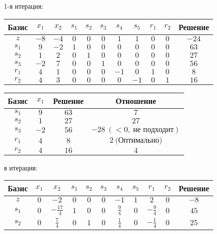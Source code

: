 \documentclass{article}%
\begin{document}
\begin{flushleft}%
1{-}я итерация: %
\newline%
\newline%
\renewcommand{\arraystretch}{1.3}%
\begin{tabular}{|c|ccccccccc|c|}%
\hline%
Базис&$x_{1}$&$x_{2}$&$s_{1}$&$s_{2}$&$s_{3}$&$s_{4}$&$s_{5}$&$r_{1}$&$r_{2}$&Решение\\%
\hline%
$z$&$-8$&$-4$&$0$&$0$&$0$&$1$&$1$&$0$&$0$&$-24$\\%
\hline%
$s_{1}$&$9$&$-2$&$1$&$0$&$0$&$0$&$0$&$0$&$0$&$63$\\%
$s_{2}$&$1$&$2$&$0$&$1$&$0$&$0$&$0$&$0$&$0$&$27$\\%
$s_{3}$&$-2$&$7$&$0$&$0$&$1$&$0$&$0$&$0$&$0$&$56$\\%
$r_{1}$&$4$&$1$&$0$&$0$&$0$&$-1$&$0$&$1$&$0$&$8$\\%
$r_{2}$&$4$&$3$&$0$&$0$&$0$&$0$&$-1$&$0$&$1$&$16$\\%
\hline%
\end{tabular}%
\newline%
\newline%
\newline%
\begin{tabular}{|cccc|}%
\hline%
Базис&$x_{1}$&Решение&Отношение\\%
\hline%
$s_{1}$&$9$&$63$&$7$\\%
$s_{2}$&$1$&$27$&$27$\\%
$s_{3}$&$-2$&$56$&$-28\: (< 0, \: \text{не подходит})$\\%
$r_{1}$&$4$&$8$&$2\: \text{(Оптимально)}$\\%
$r_{2}$&$4$&$16$&$4$\\%
\hline%
\end{tabular}%
\newline%
\newline%
я итерация: %
\newline%
\newline%
\renewcommand{\arraystretch}{1.3}%
\begin{tabular}{|c|ccccccccc|c|}%
\hline%
Базис&$x_{1}$&$x_{2}$&$s_{1}$&$s_{2}$&$s_{3}$&$s_{4}$&$s_{5}$&$r_{1}$&$r_{2}$&Решение\\%
\hline%
$z$&$0$&$-2$&$0$&$0$&$0$&$-1$&$1$&$2$&$0$&$-8$\\%
\hline%
$s_{1}$&$0$&$-\frac{17}{4}$&$1$&$0$&$0$&$\frac{9}{4}$&$0$&$-\frac{9}{4}$&$0$&$45$\\%
$s_{2}$&$0$&$\frac{7}{4}$&$0$&$1$&$0$&$\frac{1}{4}$&$0$&$-\frac{1}{4}$&$0$&$25$\\%

\end{tabular}
\end{flushleft}
\end{document}
